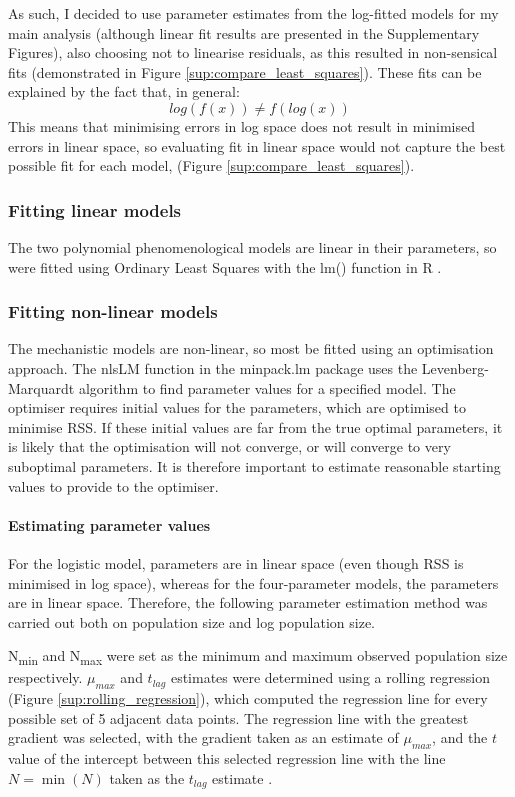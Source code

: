 \documentclass[11pt, a4paper]{article}
\begin{document}
\begin{linenumbers}
As such, I decided to use parameter estimates from the log-fitted models for my main analysis (although linear fit results are presented in the Supplementary Figures), also choosing not to linearise residuals, as this resulted in non-sensical fits (demonstrated in Figure \ref{sup:compare_least_squares}). These fits can be explained by the fact that, in general:
\[log(f(x) ) \neq f(log(x))\]
This means that minimising errors in log space does not result in minimised errors in linear space, so evaluating fit in linear space would not capture the best possible fit for each model, (Figure \ref{sup:compare_least_squares}).

\subsubsection{Fitting linear models}

The two polynomial phenomenological models are linear in their parameters, so were fitted using Ordinary Least Squares with the lm() function in R \cite{R}.

\subsubsection{Fitting non-linear models}

The mechanistic models are non-linear, so most be fitted using an optimisation approach. The nlsLM function in the minpack.lm \cite{minpack} package uses the Levenberg-Marquardt algorithm to find parameter values for a specified model.  The optimiser requires initial values for the parameters, which are optimised to minimise RSS. If these initial values are far from the true optimal parameters, it is likely that the optimisation will not converge, or will converge to very suboptimal parameters. It is therefore important to  estimate reasonable starting values to provide to the optimiser.

\paragraph{Estimating parameter values}
For the logistic model, parameters are in linear space (even though RSS is minimised in log space), whereas for the four-parameter models, the parameters are in linear space. Therefore, the following parameter estimation method was carried out both on population size and log population size. 

N\textsubscript{min} and N\textsubscript{max} were set as the minimum and maximum observed population size respectively. $\mu_{max}$ and $t_{lag}$ estimates were determined using a rolling regression (Figure \ref{sup:rolling_regression}), which computed the regression line for every possible set of 5 adjacent data points. The regression line with the greatest gradient was selected, with the gradient taken as an estimate of $\mu_{max}$, and the $t$ value of the intercept between this selected regression line with the line $N = \min(N)$ taken as the $t_{lag}$ estimate . 



\end{linenumbers}
\end{document}
